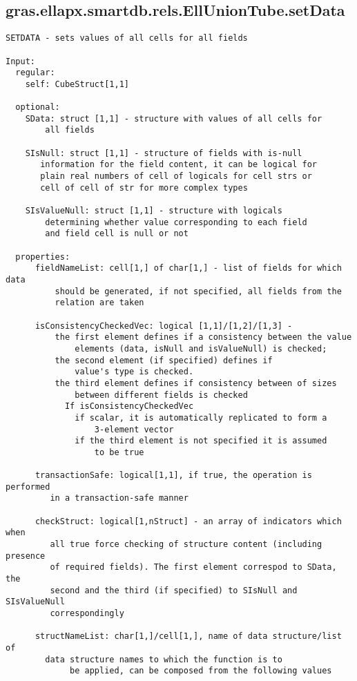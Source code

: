 \subsection{\texorpdfstring{gras.ellapx.smartdb.rels.EllUnionTube.setData}{setData}}\label{method:gras.ellapx.smartdb.rels.EllUnionTube.setData}
\begin{verbatim}
SETDATA - sets values of all cells for all fields

Input:
  regular:
    self: CubeStruct[1,1]

  optional:
    SData: struct [1,1] - structure with values of all cells for
        all fields

    SIsNull: struct [1,1] - structure of fields with is-null
       information for the field content, it can be logical for
       plain real numbers of cell of logicals for cell strs or
       cell of cell of str for more complex types

    SIsValueNull: struct [1,1] - structure with logicals
        determining whether value corresponding to each field
        and field cell is null or not

  properties:
      fieldNameList: cell[1,] of char[1,] - list of fields for which data
          should be generated, if not specified, all fields from the
          relation are taken

      isConsistencyCheckedVec: logical [1,1]/[1,2]/[1,3] -
          the first element defines if a consistency between the value
              elements (data, isNull and isValueNull) is checked;
          the second element (if specified) defines if
              value's type is checked.
          the third element defines if consistency between of sizes
              between different fields is checked
            If isConsistencyCheckedVec
              if scalar, it is automatically replicated to form a
                  3-element vector
              if the third element is not specified it is assumed
                  to be true

      transactionSafe: logical[1,1], if true, the operation is performed
         in a transaction-safe manner

      checkStruct: logical[1,nStruct] - an array of indicators which when
         all true force checking of structure content (including presence
         of required fields). The first element correspod to SData, the
         second and the third (if specified) to SIsNull and SIsValueNull
         correspondingly

      structNameList: char[1,]/cell[1,], name of data structure/list of
        data structure names to which the function is to
             be applied, can be composed from the following values


\end{verbatim}

